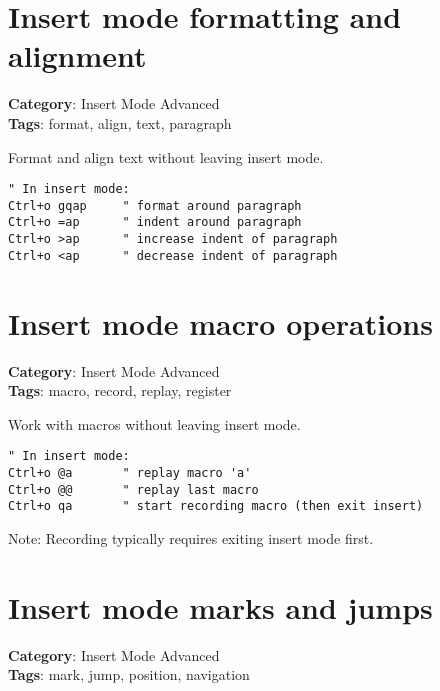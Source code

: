 {{{{{\section{Insert mode formatting and alignment}

\textbf{Category}: Insert Mode Advanced\\ \textbf{Tags}: format, align, text, paragraph
\vspace{0.5cm}

Format and align text without leaving insert mode.

\begin{Exa*}{}
\begin{Verbatim}[fontsize=\footnotesize, breaklines, breakanywhere]
" In insert mode:
Ctrl+o gqap     " format around paragraph
Ctrl+o =ap      " indent around paragraph
Ctrl+o >ap      " increase indent of paragraph
Ctrl+o <ap      " decrease indent of paragraph
\end{Verbatim}
\end{Exa*}

\section{Insert mode macro operations}

\textbf{Category}: Insert Mode Advanced\\ \textbf{Tags}: macro, record, replay, register
\vspace{0.5cm}

Work with macros without leaving insert mode.

\begin{Exa*}{}
\begin{Verbatim}[fontsize=\footnotesize, breaklines, breakanywhere]
" In insert mode:
Ctrl+o @a       " replay macro 'a'
Ctrl+o @@       " replay last macro
Ctrl+o qa       " start recording macro (then exit insert)
\end{Verbatim}
\end{Exa*}

Note: Recording typically requires exiting insert mode first.

\section{Insert mode marks and jumps}

\textbf{Category}: Insert Mode Advanced\\ \textbf{Tags}: mark, jump, position, navigation
\vspace{0.5cm}

}}}}}

